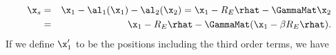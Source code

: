 \begin{eqnarray}
\x_s &=& \x_1 - \al_1(\x_1) - \al_2(\x_2) = \x_1 - R_E \rhat-  \GammaMat \x_2 \nonumber\\
&=& \x_1 - R_E \rhat -  \GammaMat (\x_1 - \beta R_E \rhat).
\label{eqn:backgroundorder2}
\end{eqnarray}
If we define $\x_1'$ to be the positions including the third order terms, we have
  
  
  